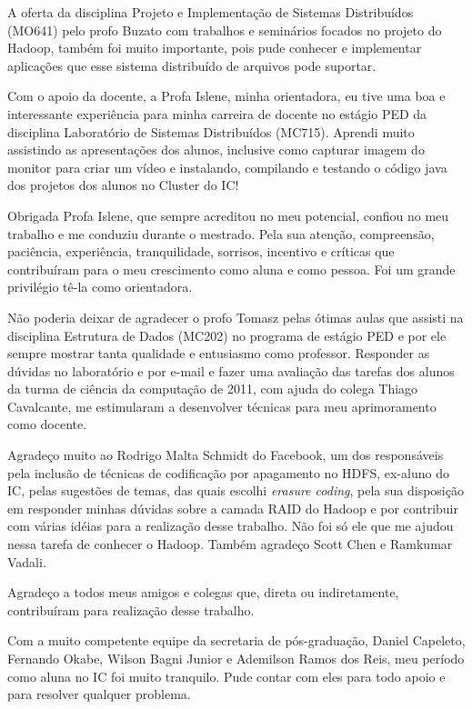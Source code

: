 A oferta da disciplina Projeto e Implementação de Sistemas Distribuídos (MO641) pelo profo Buzato com trabalhos e seminários focados no projeto do Hadoop, também foi muito importante, pois pude conhecer e implementar aplicações que esse sistema distribuído de arquivos pode suportar.

Com o apoio da docente, a Profa Islene, minha orientadora, eu tive uma boa e interessante experiência para minha carreira de docente no estágio PED da disciplina Laboratório de Sistemas Distribuídos (MC715). Aprendi muito assistindo as apresentações dos alunos, inclusive como capturar imagem do monitor para criar um vídeo e instalando, compilando e testando o código java dos projetos dos alunos no Cluster do IC!

Obrigada Profa Islene, que sempre acreditou no meu potencial, confiou no meu trabalho e me conduziu durante o mestrado. Pela sua atenção, compreensão, paciência, experiência, tranquilidade, sorrisos, incentivo e críticas que contribuíram para o meu crescimento como aluna e como pessoa. Foi um grande privilégio tê-la como orientadora.

Não poderia deixar de agradecer o profo Tomasz pelas ótimas aulas que assisti na disciplina Estrutura de Dados (MC202) no programa de estágio PED e por ele sempre mostrar tanta qualidade e entusiasmo como professor. Responder as dúvidas no laboratório e por e-mail e fazer uma avaliação das tarefas dos alunos da turma de ciência da computação de 2011, com ajuda do colega Thiago Cavalcante, me estimularam a desenvolver técnicas para meu aprimoramento como docente.

Agradeço muito ao Rodrigo Malta Schmidt do Facebook, um dos responsáveis pela inclusão de técnicas de codificação por apagamento no HDFS, ex-aluno do IC, 
pelas sugestões de temas, das quais escolhi \emph{erasure coding}, pela sua disposição em responder minhas dúvidas sobre a camada RAID do Hadoop e por contribuir com várias idéias para a realização desse trabalho. Não foi só ele que me ajudou nessa tarefa de conhecer o Hadoop. Também agradeço Scott Chen e Ramkumar Vadali.

Agradeço a todos meus amigos e colegas que, direta ou indiretamente, contribuíram para realização desse trabalho.

Com a muito competente equipe da secretaria de pós-graduação, Daniel Capeleto, Fernando Okabe, Wilson Bagni Junior e Ademilson Ramos dos Reis, meu período como aluna no IC foi muito tranquilo. Pude contar com eles para todo apoio e para resolver qualquer problema.

